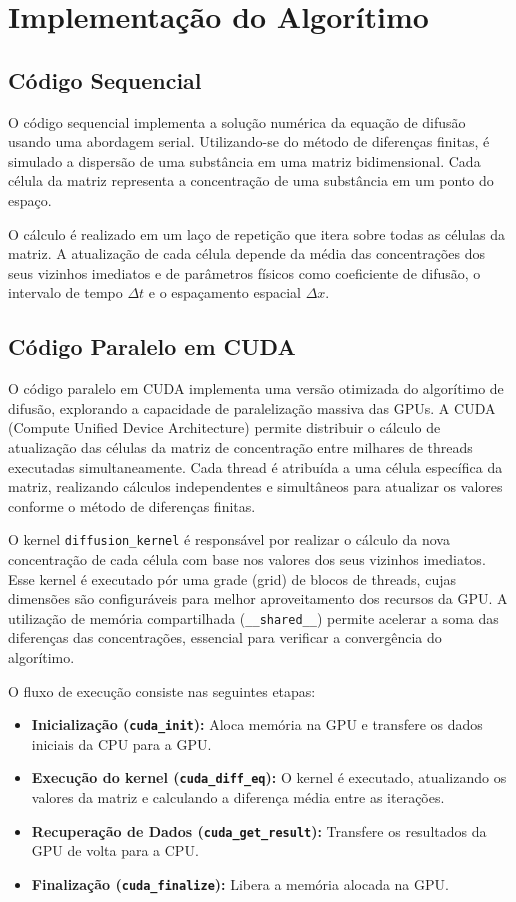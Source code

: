 \documentclass[12pt]{article}
\begin{document}
\section{Implementação do Algorítimo}

\subsection{Código Sequencial}

O código sequencial implementa a solução numérica da equação de difusão usando
uma abordagem serial. Utilizando-se do método de diferenças finitas, é simulado
a dispersão de uma substância em uma matriz bidimensional. Cada célula da
matriz representa a concentração de uma substância em um ponto do espaço.

O cálculo é realizado em um laço de repetição que itera sobre todas as células
da matriz. A atualização de cada célula depende da média das concentrações dos
seus vizinhos imediatos e de parâmetros físicos como coeficiente de difusão, o
intervalo de tempo $\Delta t$ e o espaçamento espacial $\Delta x$.

\subsection{Código Paralelo em CUDA}

O código paralelo em CUDA implementa uma versão otimizada do algorítimo de difusão, explorando a capacidade de paralelização massiva das GPUs. A CUDA (Compute Unified Device Architecture) permite distribuir o cálculo de atualização das células da matriz de concentração entre milhares de threads executadas simultaneamente. Cada thread é atribuída a uma célula específica da matriz, realizando cálculos independentes e simultâneos para atualizar os valores conforme o método de diferenças finitas.

O kernel \texttt{diffusion\_kernel} é responsável por realizar o cálculo da nova concentração de cada célula com base nos valores dos seus vizinhos imediatos. Esse kernel é executado pór uma grade (grid) de blocos de threads, cujas dimensões são configuráveis para melhor aproveitamento dos recursos da GPU. A utilização de memória compartilhada (\texttt{\_\_shared\_\_}) permite acelerar a soma das diferenças das concentrações, essencial para verificar a convergência do algorítimo.

O fluxo de execução consiste nas seguintes etapas:

\begin{itemize}
    \item \textbf{Inicialização (\texttt{cuda\_init}):} Aloca memória na GPU e transfere os dados iniciais da CPU para a GPU.
    \item \textbf{Execução do kernel (\texttt{cuda\_diff\_eq}):} O kernel é executado, atualizando os valores da matriz e calculando a diferença média entre as iterações.
    \item \textbf{Recuperação de Dados (\texttt{cuda\_get\_result}):} Transfere os resultados da GPU de volta para a CPU.
    \item \textbf{Finalização (\texttt{cuda\_finalize}):} Libera a memória alocada na GPU.
\end{itemize}
\end{document}

